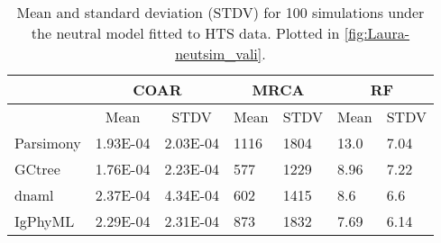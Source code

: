 \begin{table}[!ht]
\centering
\begin{tabular}{|l|l|l|l|l|l|l|}
\hline
 & \multicolumn{2}{c|}{COAR}                             & \multicolumn{2}{c|}{MRCA}                             & \multicolumn{2}{c|}{RF}                               \\ \hline
                & \multicolumn{1}{c|}{Mean} & \multicolumn{1}{c|}{STDV} & \multicolumn{1}{c|}{Mean} & \multicolumn{1}{c|}{STDV} & \multicolumn{1}{c|}{Mean} & \multicolumn{1}{c|}{STDV} \\ \hline
Parsimony       & 1.93E-04                  & 2.03E-04                  & 1116                      & 1804                      & 13.0                      & 7.04                      \\ \hline
GCtree          & 1.76E-04                  & 2.23E-04                  & 577                       & 1229                      & 8.96                      & 7.22                      \\ \hline
dnaml           & 2.37E-04                  & 4.34E-04                  & 602                       & 1415                      & 8.6                       & 6.6                       \\ \hline
IgPhyML         & 2.29E-04                  & 2.31E-04                  & 873                       & 1832                      & 7.69                      & 6.14                      \\ \hline
\end{tabular}
\caption{
\label{tab:Laura-neutsim_vali}
Mean and standard deviation (STDV) for 100 simulations under the neutral model fitted to HTS data. Plotted in \ref{fig:Laura-neutsim_vali}.
}
\end{table}









